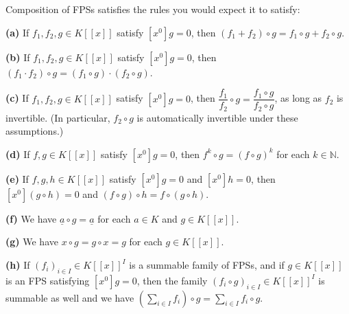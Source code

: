 \begin{proposition}
\label{prop.fps.subs.rules}
\leantarget
\leanok
Composition of FPSs satisfies the rules you would expect it to satisfy:

\textbf{(a)} If $f_1, f_2, g \in K[[x]]$ satisfy $[x^0]g = 0$, then
$(f_1 + f_2) \circ g = f_1 \circ g + f_2 \circ g$.

\textbf{(b)} If $f_1, f_2, g \in K[[x]]$ satisfy $[x^0]g = 0$, then
$(f_1 \cdot f_2) \circ g = (f_1 \circ g) \cdot (f_2 \circ g)$.

\textbf{(c)} If $f_1, f_2, g \in K[[x]]$ satisfy $[x^0]g = 0$, then
$\dfrac{f_1}{f_2} \circ g = \dfrac{f_1 \circ g}{f_2 \circ g}$, as long as
$f_2$ is invertible. (In particular, $f_2 \circ g$ is automatically invertible
under these assumptions.)

\textbf{(d)} If $f, g \in K[[x]]$ satisfy $[x^0]g = 0$, then
$f^k \circ g = (f \circ g)^k$ for each $k \in \mathbb{N}$.

\textbf{(e)} If $f, g, h \in K[[x]]$ satisfy $[x^0]g = 0$ and $[x^0]h = 0$,
then $[x^0](g \circ h) = 0$ and $(f \circ g) \circ h = f \circ (g \circ h)$.

\textbf{(f)} We have $\underline{a} \circ g = \underline{a}$ for each $a \in K$
and $g \in K[[x]]$.

\textbf{(g)} We have $x \circ g = g \circ x = g$ for each $g \in K[[x]]$.

\textbf{(h)} If $(f_i)_{i \in I} \in K[[x]]^I$ is a summable family of FPSs,
and if $g \in K[[x]]$ is an FPS satisfying $[x^0]g = 0$, then the family
$(f_i \circ g)_{i \in I} \in K[[x]]^I$ is summable as well and we have
$(\sum_{i \in I} f_i) \circ g = \sum_{i \in I} f_i \circ g$.
\end{proposition}


